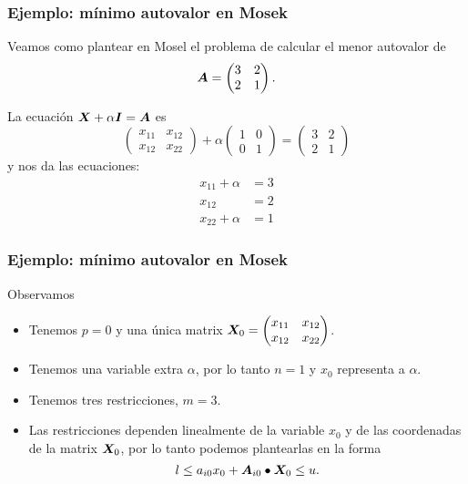 \documentclass[aspectratio=169,12pt,spanish]{beamer}
\begin{document}
\begin{frame}

\frametitle{Ejemplo: mínimo autovalor en Mosek}

Veamos como plantear en Mosel el problema de calcular el menor autovalor de 
$$
\bm{A} = \begin{pmatrix}
3 & 2 \\
2 & 1 
\end{pmatrix}.
$$

La ecuación $\bm{X} + \alpha \bm{I} = \bm{A}$ es 
$$
\begin{pmatrix} x_{11} & x_{12} \\ x_{12} & x_{22} \end{pmatrix} + \alpha \begin{pmatrix}
1 & 0 \\
0 & 1
\end{pmatrix} = \begin{pmatrix}
3 & 2 \\
2 & 1
\end{pmatrix}
$$
y nos da las ecuaciones:
\begin{align*}
x_{11} + \alpha &= 3 \\
x_{12} &= 2 \\
x_{22} + \alpha &= 1
\end{align*}


\end{frame}


\begin{frame}
\frametitle{Ejemplo: mínimo autovalor en Mosek}

Observamos
\begin{itemize}
\item Tenemos $p = 0$ y una única matrix $\bm{X}_0 = \begin{pmatrix} x_{11} & x_{12} \\ x_{12} & x_{22} \end{pmatrix}$.
\item Tenemos una variable extra $\alpha$, por lo tanto $n = 1$ y $x_0$ representa a $\alpha$.
\item Tenemos tres restricciones, $m = 3$.
\item Las restricciones dependen linealmente de la variable $x_0$ y de las coordenadas de la matrix $\bm{X}_0$, por lo tanto podemos plantearlas en la forma
$$
l \le a_{i0} x_0 + \bm{A}_{i0} \bullet \bm{X}_0 \le u.
$$

\end{itemize}
\end{frame}
\end{document}
